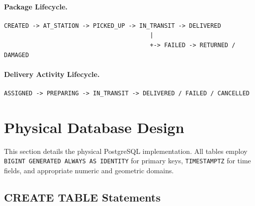 \paragraph{Package Lifecycle.}
\begin{verbatim}
CREATED -> AT_STATION -> PICKED_UP -> IN_TRANSIT -> DELIVERED
                                         |
                                         +-> FAILED -> RETURNED / DAMAGED
\end{verbatim}

\paragraph{Delivery Activity Lifecycle.}
\begin{verbatim}
ASSIGNED -> PREPARING -> IN_TRANSIT -> DELIVERED / FAILED / CANCELLED
\end{verbatim}

\section{Physical Database Design}\label{s:physical}

This section details the physical PostgreSQL implementation. All tables employ \texttt{BIGINT GENERATED ALWAYS AS IDENTITY} for primary keys, \texttt{TIMESTAMPTZ} for time fields, and appropriate numeric and geometric domains.

\subsection{CREATE TABLE Statements}

